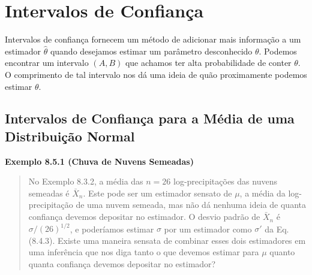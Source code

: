 \section{Intervalos de Confiança}

Intervalos de confiança fornecem um método de adicionar mais informação a um estimador $\hat{\theta}$ quando desejamos estimar um parâmetro desconhecido $\theta$. Podemos encontrar um intervalo $(A, B)$ que achamos ter alta probabilidade de conter $\theta$. O comprimento de tal intervalo nos dá uma ideia de quão proximamente podemos estimar $\theta$.

\subsection*{Intervalos de Confiança para a Média de uma Distribuição Normal}

\vspace{1em}
\noindent\textbf{Exemplo 8.5.1 (Chuva de Nuvens Semeadas)}
\begin{quote}
    No Exemplo 8.3.2, a média das $n=26$ log-precipitações das nuvens semeadas é $\bar{X}_n$. Este pode ser um estimador sensato de $\mu$, a média da log-precipitação de uma nuvem semeada, mas não dá nenhuma ideia de quanta confiança devemos depositar no estimador. O desvio padrão de $\bar{X}_n$ é $\sigma/(26)^{1/2}$, e poderíamos estimar $\sigma$ por um estimador como $\sigma'$ da Eq. (8.4.3). Existe uma maneira sensata de combinar esses dois estimadores em uma inferência que nos diga tanto o que devemos estimar para $\mu$ quanto quanta confiança devemos depositar no estimador?
\end{quote}
\vspace{1em}

